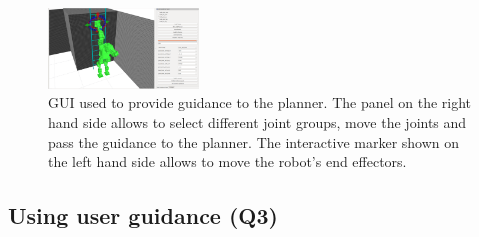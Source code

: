 \documentclass{article}
\begin{document}
\begin{figure}[tb]
  \centering
  	\includegraphics[width=0.355\textwidth]{fig/panel.png}
  \caption{
		GUI used to provide guidance to the planner. The panel on the right hand side allows to select different joint groups, move the joints and pass the guidance to the planner. The interactive marker shown on the left hand side allows to move the robot's end effectors.
}
   	\label{fig:gui}
  	\vspace{-4.5mm}
\end{figure}

\subsection{Using user guidance (Q3)}
\label{sec:q3}
\end{document}
